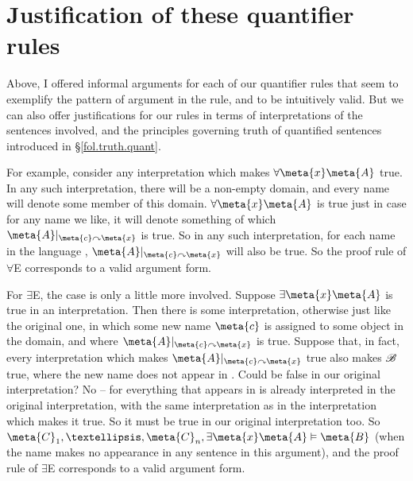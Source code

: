 \section{Justification of these quantifier rules}

Above, I offered informal arguments for each of our quantifier rules that seem to exemplify the pattern of argument in the rule, and to be intuitively valid. But we can also offer justifications for our rules in terms of interpretations of the sentences involved, and the principles governing truth of quantified sentences introduced in §\ref{fol.truth.quant}. 

For example, consider any interpretation which makes $\forall\meta{x}\meta{A}$ true. In any such interpretation, there will be a non-empty domain, and every name will denote some member of this domain. $\forall\meta{x}\meta{A}$ is true just in case for any name we like, it will denote something of which $\meta{A}\subs{\meta{c}}{\meta{x}}$ is true. So in any such interpretation, for each name in the language , $\meta{A}\subs{\meta{c}}{\meta{x}}$ will also be true. So the proof rule of $\forall$E corresponds to a valid argument form.

For $\exists$E, the case is only a little more involved. Suppose $\exists\meta{x}\meta{A}$ is true in an interpretation. Then there is some interpretation, otherwise just like the original one, in which some new name $\meta{c}$ is assigned to some object in the domain, and where $\meta{A}\subs{\meta{c}}{\meta{x}}$ is true. Suppose that, in fact, every interpretation which makes $\meta{A}\subs{\meta{c}}{\meta{x}}$ true also makes  $\mathscr{B}$ true, where the new name  does not appear in . Could  be false in our original interpretation? No – for everything that appears in  is already interpreted in the original interpretation, with the same interpretation as in the interpretation which makes it true. So it must be true in our original interpretation too. So $\meta{C}_{1},…,\meta{C}_{n},\exists\meta{x}\meta{A}\entails \meta{B}$ (when the name  makes no appearance in any sentence in this argument), and the proof rule of $\exists$E corresponds to a valid argument form.

